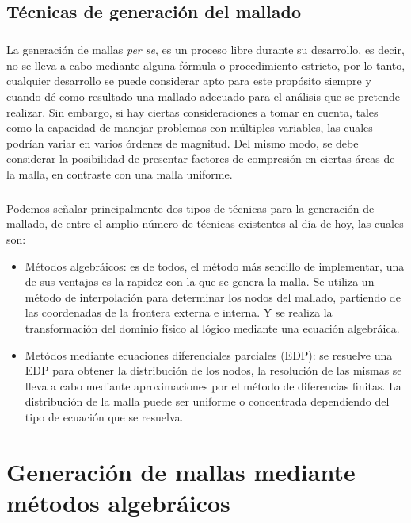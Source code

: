 \documentclass[letterpaper, openright, 12pt]{book}
\begin{document}
	\section{Técnicas de generación del mallado}
		\paragraph*{}
			La generación de mallas \textit{per se}, es un proceso libre durante su desarrollo, es decir, no se lleva a cabo mediante alguna fórmula o procedimiento estricto, por lo tanto, cualquier desarrollo se puede considerar apto para este propósito siempre y cuando dé como resultado una mallado adecuado para el análisis que se pretende realizar. Sin embargo, si hay ciertas consideraciones a tomar en cuenta, tales como la capacidad de manejar problemas con múltiples variables, las cuales podrían variar en varios órdenes de magnitud. Del mismo modo, se debe considerar la posibilidad de presentar factores de compresión en ciertas áreas de la malla, en contraste con una malla uniforme.
			
		\paragraph*{}
			Podemos señalar principalmente dos tipos de técnicas para la generación de mallado, de entre el amplio número de técnicas existentes al día de hoy, las cuales son:
			\begin{itemize}
				\item Métodos algebráicos: es de todos, el método más sencillo de implementar, una de sus ventajas es la rapidez con la que se genera la malla. Se utiliza un método de interpolación para determinar los nodos del mallado, partiendo de las coordenadas de la frontera externa e interna. Y se realiza la transformación del dominio físico al lógico mediante una ecuación algebráica.
				\item Metódos mediante  ecuaciones diferenciales parciales (EDP): se resuelve una EDP para obtener la distribución de los nodos, la resolución de las mismas se lleva a cabo mediante aproximaciones por el método de diferencias finitas.  La distribución de la malla puede ser uniforme o concentrada dependiendo del tipo de ecuación que se resuelva.
			\end{itemize}
%
%
%
%
%		

%
%
%
%
%
\chapter{Generación de mallas mediante métodos algebráicos}
\end{document}
